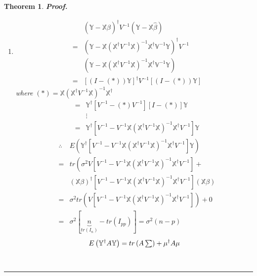 \documentclass{article}
\newtheorem{theorem}{Theorem}
\newenvironment{proof}[1][Proof]{\noindent\textbf{#1.} }{\ \rule{0.5em}{0.5em}}
\begin{document}
\begin{theorem}
\begin{proof}
\begin{enumerate}
\item 
\begin{eqnarray*}
&&\left( \mathbb{Y-X}\hat{\beta}\right) ^{\dagger }V^{-1}\left( \mathbb{Y-X}%
\hat{\beta}\right) \\
&=&\left( \mathbb{Y-X}\left( \mathbb{X}^{\dagger }V^{-1}\mathbb{X}\right)
^{-1}\mathbb{X}^{\dagger }\mathbb{V}^{-1}\mathbb{Y}\right) ^{\dagger }V^{-1}
\\
&&\left( \mathbb{Y-X}\left( \mathbb{X}^{\dagger }V^{-1}\mathbb{X}\right)
^{-1}\mathbb{X}^{\dagger }\mathbb{V}^{-1}\mathbb{Y}\right) \\
&=&\left[ \left( I-\left( \ast \right) \right) \mathbb{Y}\right] ^{\dagger
}V^{-1}\left[ \left( I-\left( \ast \right) \right) \mathbb{Y}\right]
\end{eqnarray*}%
where $(\ast )=\mathbb{X}\left( \mathbb{X}^{\dagger }V^{-1}\mathbb{X}\right)
^{-1}\mathbb{X}^{\dagger }$%
\begin{eqnarray*}
&=&\mathbb{Y}^{\dagger }\left[ V^{-1}-\left( \ast \right) V^{-1}\right] %
\left[ I-\left( \ast \right) \right] \mathbb{Y} \\
&&\vdots \\
&=&\mathbb{Y}^{\dagger }\left[ V^{-1}-V^{-1}\mathbb{X}\left( \mathbb{X}%
^{\dagger }V^{-1}\mathbb{X}\right) ^{-1}\mathbb{X}^{\dagger }V^{-1}\right] 
\mathbb{Y}
\end{eqnarray*}%
\newline
\newline
\begin{eqnarray*}
&\therefore &E\left( \mathbb{Y}^{\dagger }\left[ V^{-1}-V^{-1}\mathbb{X}%
\left( \mathbb{X}^{\dagger }V^{-1}\mathbb{X}\right) ^{-1}\mathbb{X}^{\dagger
}V^{-1}\right] \mathbb{Y}\right) \\
&=&tr\left( \sigma ^{2}V\left[ V^{-1}-V^{-1}\mathbb{X}\left( \mathbb{X}%
^{\dagger }V^{-1}\mathbb{X}\right) ^{-1}\mathbb{X}^{\dagger }V^{-1}\right]
+\right. \\
&&\left( \mathbb{X}\beta \right) ^{\dagger }\left[ V^{-1}-V^{-1}\mathbb{X}%
\left( \mathbb{X}^{\dagger }V^{-1}\mathbb{X}\right) ^{-1}\mathbb{X}^{\dagger
}V^{-1}\right] \left( \mathbb{X}\beta \right) \\
&=&\sigma ^{2}tr\left( V\left[ V^{-1}-V^{-1}\mathbb{X}\left( \mathbb{X}%
^{\dagger }V^{-1}\mathbb{X}\right) ^{-1}\mathbb{X}^{\dagger }V^{-1}\right]
\right) +0 \\
&=&\sigma ^{2}\left[ \underset{tr\left( I_{n}\right) }{\underbrace{n}}%
-tr\left( I_{pp}\right) \right] =\sigma ^{2}\left( n-p\right)
\end{eqnarray*}%
\newline
\newline
\begin{equation*}
E\left( \mathbb{Y}^{\dagger }A\mathbb{Y}\right) =tr\left( A\tsum \right)
+\mu ^{\dagger }A\mu
\end{equation*}
\end{enumerate}
\end{proof}
\end{theorem}
\end{document}
